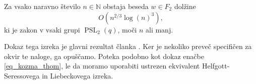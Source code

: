     \begin{izrek}
    \label{izr_bradford_thom}
    Za vsako naravno število $n \in \mathbb{N}$ obstaja beseda $w \in F_2$ dolžine \begin{equation*}
        O( n^{2 / 3} {\log(n)}^3),
        \end{equation*}  
        ki je zakon v vsaki grupi $\operatorname{PSL}_2(q)$, moči $n$ ali manj.
    \end{izrek}
    Dokaz tega izreka je glavni rezultat članka \cite{Bradford_Thom_2017}. Ker je nekoliko preveč specifičen za okvir te naloge, ga opuščamo.
    Poteka podobno kot dokaz enačbe \ref{eq_kozma_thom}, le da moramo uporabiti ustrezen ekvivalent Helfgott-Seressovega in Liebeckovega izreka. 

    

